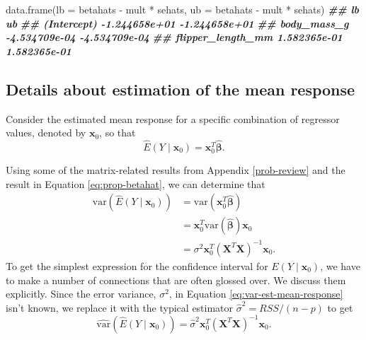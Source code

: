 \documentclass[
]{book}
\newenvironment{Shaded}{\begin{snugshade}}{\end{snugshade}}
\newcommand{\AttributeTok}[1]{\textcolor[rgb]{0.77,0.63,0.00}{#1}}
\newcommand{\DocumentationTok}[1]{\textcolor[rgb]{0.56,0.35,0.01}{\textbf{\textit{#1}}}}
\newcommand{\FunctionTok}[1]{\textcolor[rgb]{0.00,0.00,0.00}{#1}}
\newcommand{\NormalTok}[1]{#1}
\newcommand{\SpecialCharTok}[1]{\textcolor[rgb]{0.00,0.00,0.00}{#1}}
\theoremstyle{definition}
\theoremstyle{definition}
\theoremstyle{definition}
\theoremstyle{definition}
\theoremstyle{remark}
\begin{document}
\begin{Shaded}
\begin{Highlighting}[]
\FunctionTok{data.frame}\NormalTok{(}\AttributeTok{lb =}\NormalTok{ betahats }\SpecialCharTok{{-}}\NormalTok{ mult }\SpecialCharTok{*}\NormalTok{ sehats,}
           \AttributeTok{ub =}\NormalTok{ betahats }\SpecialCharTok{{-}}\NormalTok{ mult }\SpecialCharTok{*}\NormalTok{ sehats)}
\DocumentationTok{\#\#                              lb            ub}
\DocumentationTok{\#\# (Intercept)       {-}1.244658e+01 {-}1.244658e+01}
\DocumentationTok{\#\# body\_mass\_g       {-}4.534709e{-}04 {-}4.534709e{-}04}
\DocumentationTok{\#\# flipper\_length\_mm  1.582365e{-}01  1.582365e{-}01}
\end{Highlighting}
\end{Shaded}

\hypertarget{mean-response-calculations}{%
\subsection{Details about estimation of the mean response}\label{mean-response-calculations}}

Consider the estimated mean response for a specific combination of
regressor values, denoted by \(\mathbf{x}_0\), so that
\[\hat{E}(Y\mid \mathbf{x}_0)=\mathbf{x}_0^T\hat{\boldsymbol{\beta}}.\]

Using some of the matrix-related results from Appendix
\ref{prob-review} and the result in Equation \eqref{eq:prop-betahat}, we
can determine that
\[
\begin{aligned}
\mathrm{var}\left(\hat{E}(Y \mid \mathbf{x}_0)\right) &= \mathrm{var}(\mathbf{x}_0^T \hat{\boldsymbol{\beta}}) \\
&= \mathbf{x}_0^T \mathrm{var}(\hat{\boldsymbol{\beta}})\mathbf{x}_0\\
&= \sigma^2 \mathbf{x}_0^T (\mathbf{X}^T \mathbf{X})^{-1}\mathbf{x}_0.
\end{aligned}
\label{eq:var-est-mean-response}
\]
To get the simplest expression for the confidence interval for
\(E(Y\mid\mathbf{x}_0)\), we have to make a number of connections that are often glossed over. We discuss them explicitly. Since the error
variance, \(\sigma^2\), in Equation \eqref{eq:var-est-mean-response} isn't
known, we replace it with the typical estimator
\(\hat{\sigma}^2=RSS/(n-p)\) to get
\[
\hat{\mathrm{var}}\left(\hat{E}(Y\mid\mathbf{x}_0)\right)=\hat{\sigma}^2 \mathbf{x}_0^T (\mathbf{X}^T \mathbf{X})^{-1}\mathbf{x}_0. \label{eq:est-var-mean}
\]
\end{document}
